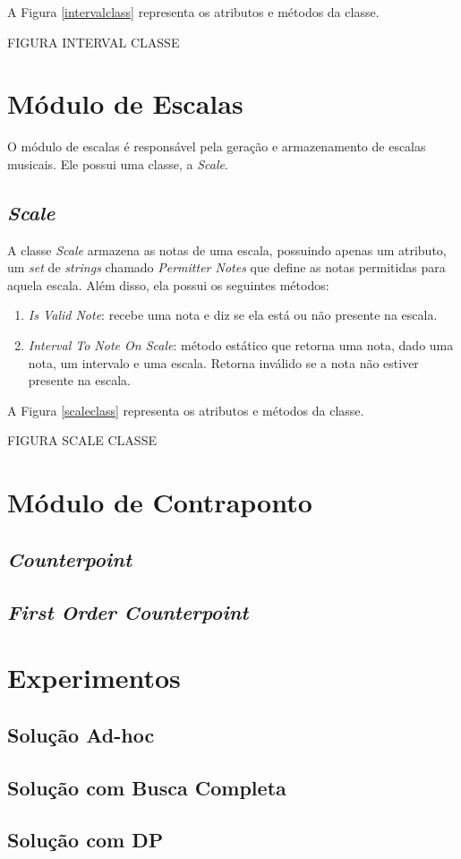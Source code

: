       A Figura \ref{intervalclass} representa os atributos e métodos da classe.

      FIGURA INTERVAL CLASSE

  \section[Módulo de Escalas]{Módulo de Escalas}

    O módulo de escalas é responsável pela geração e armazenamento de escalas musicais. Ele possui uma classe, a \textit{Scale}.

    \subsection[\textit{Scale}]{\textit{Scale}}

    A classe \textit{Scale} armazena as notas de uma escala, possuindo apenas um atributo, um \textit{set} de \textit{strings} chamado \textit{Permitter Notes} que define as notas permitidas para aquela escala. Além disso, ela possui os seguintes métodos:

    \begin{enumerate}
      \item \textit{Is Valid Note}: recebe uma nota e diz se ela está ou não presente na escala.
      \item \textit{Interval To Note On Scale}: método estático que retorna uma nota, dado uma nota, um intervalo e uma escala. Retorna inválido se a nota não estiver presente na escala.
    \end{enumerate}


    A Figura \ref{scaleclass} representa os atributos e métodos da classe.

    FIGURA SCALE CLASSE

  \section[Módulo de Contraponto]{Módulo de Contraponto}
    \subsection[\textit{Counterpoint}]{\textit{Counterpoint}}
    \subsection[\textit{First Order Counterpoint}]{\textit{First Order Counterpoint}}

  \section[Experimentos]{Experimentos}
  \subsection[\textit{Solução Ad-hoc}]{Solução Ad-hoc}
  \subsection[\textit{Solução com Busca Completa}]{Solução com Busca Completa}
    \subsection[\textit{Solução com DP}]{Solução com DP}
